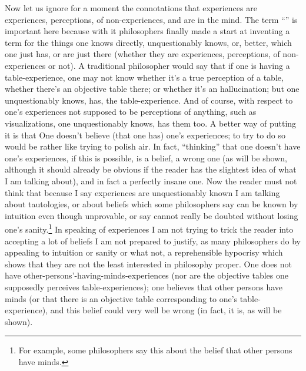 Now let us ignore for a moment the connotations that experiences are 
experiences, perceptions, of non-experiences, and are in the mind. The term 
\enquote{} is important here because with it philosophers finally made a 
start at inventing a term for the things one knows directly, unquestionably 
knows, or, better, which one just has, or are just there (whether they are 
experiences, perceptions, of non-experiences or not). A traditional 
philosopher would say that if one is having a table-experience, one may not 
know whether it's a true perception of a table, whether there's an objective 
table there; or whether it's an hallucination; but one unquestionably knows, 
has, the table-experience. And of course, with respect to one's experiences 
not supposed to be perceptions of anything, such as visualizations, one 
unquestionably knows, has them too. A better way of putting it is that 
One doesn't believe (that one has) one's experiences; to try to do so would 
be rather like trying to polish air. In fact, \enquote{thinking} that one doesn't have 
one's experiences, if this is possible, is a belief, a wrong one (as will be 
shown, although it should already be obvious if the reader has the slightest 
idea of what I am talking about), and in fact a perfectly insane one. Now the 
reader must not think that because I say experiences are unquestionably 
known I am talking about tautologies, or about beliefs which some 
philosophers say can be known by intuition even though unprovable, or say 
cannot really be doubted without losing one's sanity.\footnote{For example, some 
philosophers say this about the belief that other persons have minds.} In 
speaking of experiences I am not trying to trick the reader into accepting a 
lot of beliefs I am not prepared to justify, as many philosophers do by 
appealing to intuition or sanity or what not, a reprehensible hypocrisy 
which shows that they are not the least interested in philosophy proper. One 
does not have other-persons'-having-minds-experiences (nor are the objective 
tables one supposedly perceives table-experiences); one believes that other 
persons have minds (or that there is an objective table corresponding to one's 
table-experience), and this belief could very well be wrong (in fact, it is, as 
will be shown). 

